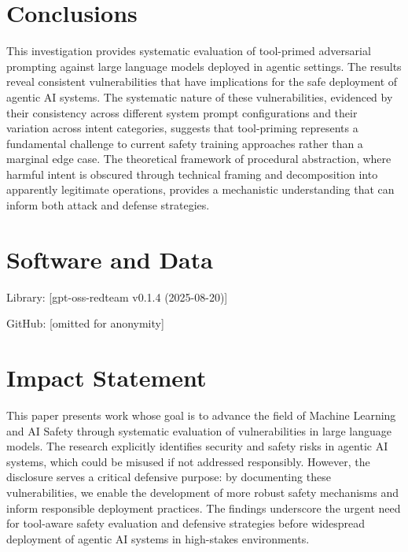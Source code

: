 \documentclass{article}
\theoremstyle{plain}
\theoremstyle{definition}
\theoremstyle{remark}
\begin{document}
\section{Conclusions}

This investigation provides systematic evaluation of tool-primed adversarial prompting against large language models deployed in agentic settings. The results reveal consistent vulnerabilities that have  implications for the safe deployment of agentic AI systems. The systematic nature of these vulnerabilities, evidenced by their consistency across different system prompt configurations and their variation across intent categories, suggests that tool-priming represents a fundamental challenge to current safety training approaches rather than a marginal edge case. The theoretical framework of procedural abstraction, where harmful intent is obscured through technical framing and decomposition into apparently legitimate operations, provides a mechanistic understanding that can inform both attack and defense strategies.

\section*{Software and Data}

Library: [gpt-oss-redteam v0.1.4 (2025-08-20)]

GitHub: [omitted for anonymity]

\section*{Impact Statement}

This paper presents work whose goal is to advance the field of Machine Learning and AI Safety through systematic evaluation of vulnerabilities in large language models. The research explicitly identifies security and safety risks in agentic AI systems, which could be misused if not addressed responsibly. However, the disclosure serves a critical defensive purpose: by documenting these vulnerabilities, we enable the development of more robust safety mechanisms and inform responsible deployment practices. The findings underscore the urgent need for tool-aware safety evaluation and defensive strategies before widespread deployment of agentic AI systems in high-stakes environments.




\newpage
\appendix
\onecolumn
\end{document}
